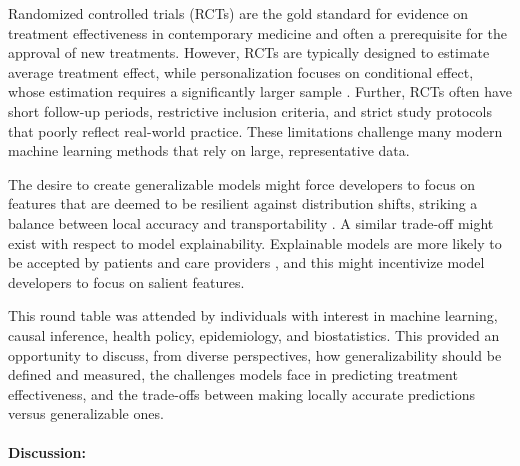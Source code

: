 Randomized controlled trials (RCTs) are the gold standard for evidence on treatment effectiveness in contemporary medicine and often a prerequisite for the approval of new treatments. However, RCTs are typically designed to estimate average treatment effect, while personalization focuses on conditional effect, whose estimation requires a significantly larger sample \citep{curth2024using}. Further, RCTs often have short follow-up periods, restrictive inclusion criteria, and strict study protocols that poorly reflect real-world practice. These limitations challenge many modern machine learning methods that rely on large, representative data.

The desire to create generalizable models might force developers to focus on features that are deemed to be resilient against distribution shifts, striking a balance between local accuracy and transportability \citep{subbaswamy2019preventingfailuresdatasetshift}. A similar trade-off might exist with respect to model explainability. Explainable models are more likely to be accepted by patients and care providers \citep{holzinger2019causability}, and this might incentivize model developers to focus on salient features. 

This round table was attended by individuals with interest in machine learning, causal inference, health policy, epidemiology, and biostatistics. This provided an opportunity to discuss, from diverse perspectives, how generalizability should be defined and measured, the challenges models face in predicting treatment effectiveness, and the trade-offs between making locally accurate predictions versus generalizable ones.

\paragraph{Discussion:}

